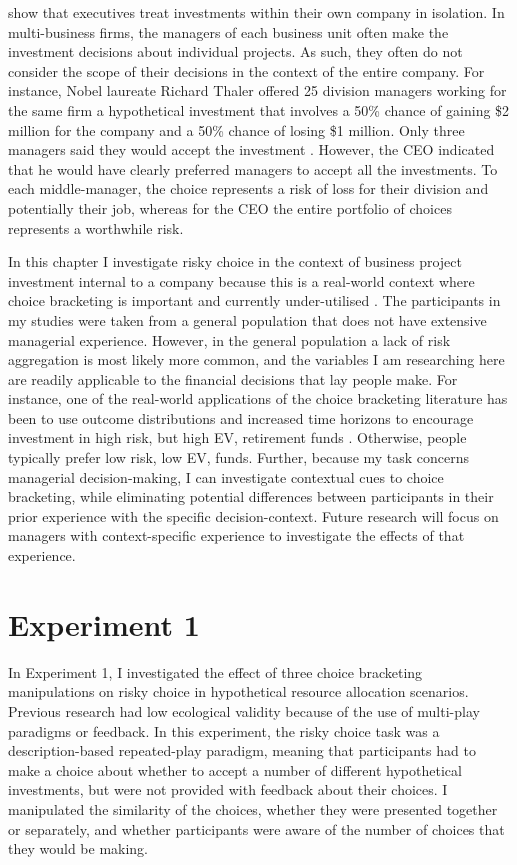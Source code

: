 \documentclass[a4paper, nobind, dvipsnames]{templates/ociamthesis}
\theoremstyle{definition}
\theoremstyle{definition}
\theoremstyle{definition}
\theoremstyle{definition}
\theoremstyle{remark}
\begin{document}
\textcite{lovallo2020} show that executives treat investments within their own company in
isolation. In multi-business firms, the managers of each business unit often
make the investment decisions about individual projects. As such, they often do
not consider the scope of their decisions in the context of the entire company.
For instance, Nobel laureate Richard Thaler offered 25 division managers working
for the same firm a hypothetical investment that involves a 50\% chance of
gaining \$2 million for the company and a 50\% chance of losing \$1 million. Only
three managers said they would accept the investment \autocite{thaler1999}. However, the
CEO indicated that he would have clearly preferred managers to accept all the
investments. To each middle-manager, the choice represents a risk of loss for
their division and potentially their job, whereas for the CEO the entire
portfolio of choices represents a worthwhile risk.

In this chapter I investigate risky choice in the context of business project
investment internal to a company because this is a real-world context where
choice bracketing is important and currently under-utilised \autocite{lovallo2020}. The
participants in my studies were taken from a general population that does not
have extensive managerial experience. However, in the general population a lack
of risk aggregation is most likely more common, and the variables I am
researching here are readily applicable to the financial decisions that lay
people make. For instance, one of the real-world applications of the choice
bracketing literature has been to use outcome distributions and increased time
horizons to encourage investment in high risk, but high EV, retirement funds
\autocite[e.g.,][]{benartzi1999}. Otherwise, people typically prefer low risk, low EV,
funds. Further, because my task concerns managerial decision-making, I can
investigate contextual cues to choice bracketing, while eliminating potential
differences between participants in their prior experience with the specific
decision-context. Future research will focus on managers with
context-specific experience to investigate the effects of that experience.

\hypertarget{experiment-1}{%
\section{Experiment 1}\label{experiment-1}}

In Experiment 1, I investigated the effect of three choice bracketing
manipulations on risky choice in hypothetical resource allocation scenarios.
Previous research had low ecological validity because of the use of multi-play
paradigms or feedback. In this experiment, the risky choice task was a
description-based repeated-play paradigm, meaning that participants had to make
a choice about whether to accept a number of different hypothetical investments,
but were not provided with feedback about their choices. I manipulated the
similarity of the choices, whether they were presented together or separately,
and whether participants were aware of the number of choices that they would be
making.
\end{document}
